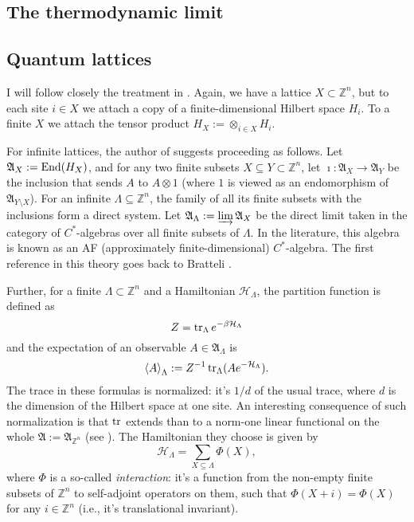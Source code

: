 \subsection{The thermodynamic limit}

\subsection{Quantum lattices}
I will follow closely the treatment in \cite{israel}. Again, we have a lattice $X \subset \mathbb Z^n$, but to each site $i \in X$ we attach a copy of a finite-dimensional Hilbert space $H_i$. To a finite $X$ we attach the tensor product $H_X := \otimes_{i \in X} H_i$. %

For infinite lattices, the author of \cite{israel} suggests proceeding as follows. Let $\mathfrak{A}_X := \operatorname{End}(H_X)$, and for any two finite subsets $X \subseteq Y \subset \mathbb Z^n$, let $\imath : \mathfrak{A}_X \rightarrow \mathfrak{A}_Y$ be the inclusion that sends $A$ to $A \otimes 1$ (where $1$ is viewed as an endomorphism of $\mathfrak{A}_{Y\setminus X}$). For an infinite $\Lambda \subseteq \mathbb Z^n$, the family of all its finite subsets with the inclusions form a direct system. Let $\mathfrak A_{\Lambda} := \varinjlim \mathfrak{A}_X$ be the direct limit taken in the category of $C^*$-algebras over all finite subsets of $\Lambda$. In the literature, this algebra is known as an AF (approximately finite-dimensional) $C^*$-algebra. The first reference in this theory goes back to Bratteli \cite{bratteli}.

Further, for a finite $\Lambda \subset \mathbb Z^n$ and a Hamiltonian $\mathcal H_{\Lambda}$, the partition function is defined as
\[
Z = \operatorname{tr}_{\Lambda} e^{-\beta \mathcal H_{\Lambda}}
\]
and the expectation of an observable $A \in \mathfrak A_{\Lambda}$ is 
\[
\left\langle A \right\rangle_{\Lambda} := Z^{-1} \operatorname{tr}_{\Lambda} (A e^{-\mathcal H_{\Lambda}}).
\]
The trace in these formulas is normalized: it's $1/d$ of the usual trace, where $d$ is the dimension of the Hilbert space at one site. An interesting consequence of such normalization is that $\operatorname{tr}$ extends than to a norm-one linear functional on the whole $\mathfrak A:= \mathfrak A_{\mathbb Z^n}$ (see \cite{israel}). The Hamiltonian they choose is given by
\[
\mathcal H_{\Lambda} = \sum_{X \subseteq \Lambda} \Phi(X),
\]
where $\Phi$ is a so-called \emph{interaction}: it's a function from the non-empty finite subsets of $\mathbb Z^n$ to self-adjoint operators on them, such that $\Phi(X+i) = \Phi(X)$ for any $i \in \mathbb Z^n$ (i.e., it's translational invariant).

